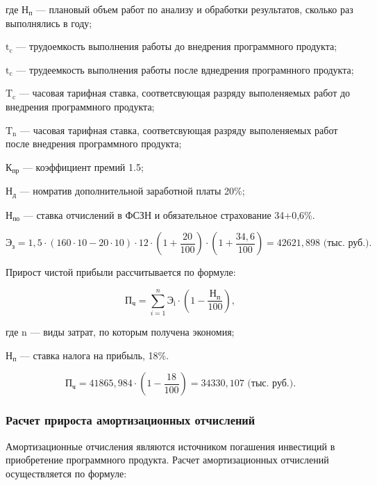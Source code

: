 где \(\text{Н}_{\text{п}}\) --- плановый объем работ по анализу и обработки результатов, сколько раз выполнялись в году;

\(\text{t}_{\text{c}}\) --- трудоемкость выполнения работы до внедрения программного продукта; 

\(\text{t}_{\text{c}}\) --- трудеемкость выполнения работы после вднедрения програмнного продукта;

\(\text{T}_{\text{c}}\) --- часовая тарифная ставка, соответсвующая разряду выполеняемых работ до внедрения программного продукта;

\(\text{T}_{\text{n}}\) --- часовая тарифная ставка, соответсвующая разряду выполеняемых работ после внедрения программного продукта;

\(\text{К}_{\text{пр}}\) --- коэффициент премий 1.5; 

\(\text{Н}_{\text{д}}\) --- номратив дополнительной заработной платы 20\%;

\(\text{Н}_{\text{по}}\) --- ставка отчислений в ФСЗН и обязательное страхование 34+0,6\%. 

\begin{displaymath}
    \text{Э}_{\text{з}} = 1,5\cdot(160\cdot10-20\cdot10)\cdot12\cdot(1+\frac{20}{100})\cdot(1+\frac{34,6}{100}) = 42621,898 \text{ (тыс. руб.)}.
\end{displaymath}

Прирост чистой прибыли рассчитывается по формуле:

\begin{displaymath}
  \text{П}_{\text{ч}} = \sum\limits_{i=1}^n \text{Э}_{\text{i}}\cdot(1-\frac{\text{Н}_{\text{п}}}{100}),
\end{displaymath}

где \(\text{n}\) --- виды затрат, по которым получена экономия;

\(\text{Н}_{\text{п}}\) --- ставка налога на прибыль, 18\%.

\begin{displaymath}
    \text{П}_{\text{ч}} = 41865,984\cdot(1-\frac{18}{100}) = 34330,107 \text{ (тыс. руб.)}.
\end{displaymath}

\subsubsection{Расчет прироста амортизационных отчислений}

Амортизационные отчисления являются источником погашения инвестиций в приобретение программного продукта. Расчет амортизационных отчислений осуществляется по формуле:


